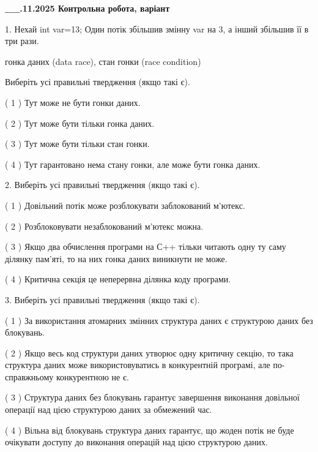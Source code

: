 \documentclass[12pt, ukrainian]{article}
\begin{document}
\newpage
\begin {large}

\textbf{\_\_.11.2025 Контрольна робота, варіант  }\par


{
1. Нехай int var=13; Один потік збільшив змінну var на 3, а інший збільшив її в три рази.

гонка даних (data race), стан гонки (race condition)

Виберіть усі правильні твердження (якщо такі є).\par
\vspace{2mm}
( 1 ) Тут може не бути гонки даних.%

( 2 ) Тут може бути тільки гонка даних.%

( 3 ) Тут може бути тільки стан гонки.%

( 4 ) Тут гарантовано нема стану гонки, але може бути гонка даних.%


2. Виберіть усі правильні твердження (якщо такі є).\par
\vspace{2mm}

( 1 ) Довільний потік може розблокувати заблокований м’ютекс.%

( 2 ) Розблоковувати незаблокований м’ютекс можна.%

( 3 ) Якщо два обчислення програми на С++ тільки читають одну ту саму ділянку пам'яті, то на них гонка даних  виникнути не може.%

( 4 ) Критична секція це неперервна ділянка коду програми.%


3. Виберіть усі правильні твердження (якщо такі є).\par
\vspace{2mm}

( 1 ) За використання атомарних змінних структура даних є структурою даних без блокувань.%

( 2 ) Якщо весь код структури даних утворює одну критичну секцію, то така структура даних може використовуватись в конкурентній програмі, але по-справжньо\-му конкурентною не є.%

( 3 ) Структура даних без блокувань гарантує завершення виконання довільної операції над цією структурою даних за обмежений час.%

( 4 ) Вільна від блокувань структура даних гарантує, що жоден потік не буде очікувати доступу до виконання операцій над цією структурою даних.%


}
\end{large}
\end{document}
